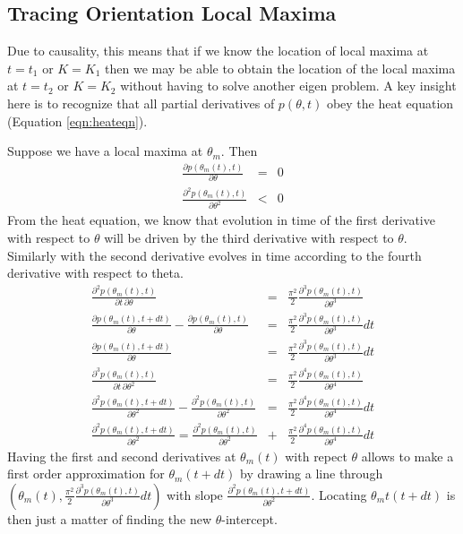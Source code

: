 \documentclass{article}
\begin{document}
\subsection{Tracing Orientation Local Maxima}
Due to causality, this means that if we know the location of local maxima at $ t = t_1 $ or $ K = K_1 $ then we may be able to obtain the location of the local maxima at $ t = t_2 $ or $ K = K_2 $ without having to solve another eigen problem. A key insight here is to recognize that all partial derivatives of $ p(\theta,t) $ obey the heat equation (Equation \ref{eqn:heateqn}).

Suppose we have a local maxima at $ \theta_m $. Then
\begin{eqnarray}
	\frac{\partial p(\theta_m(t),t)}{\partial \theta} & = & 0 \\
	\frac{\partial^2 p(\theta_m(t),t)}{\partial \theta^2} & < & 0 
\end{eqnarray}
From the heat equation, we know that evolution in time of the first derivative with respect to $ \theta $ will be driven by the third derivative with respect to $ \theta $. Similarly with the second derivative evolves in time according to the fourth derivative with respect to theta.
\begin{eqnarray}
	\frac{\partial^2 p(\theta_m(t),t)}{\partial t \, \partial \theta} & = & \frac{\pi^2}{2} \frac{\partial^3 p(\theta_m(t),t)}{\partial \theta^3} \\
	\frac{\partial p(\theta_m(t),t+dt)}{\partial \theta} - \frac{\partial p(\theta_m(t),t)}{\partial \theta} & = & \frac{\pi^2}{2} \frac{\partial^3 p(\theta_m(t),t)}{\partial \theta^3} dt \\
	\frac{\partial p(\theta_m(t),t+dt)}{\partial \theta} & = & \frac{\pi^2}{2} \frac{\partial^3 p(\theta_m(t),t)}{\partial \theta^3} dt \\
	\frac{\partial^3 p(\theta_m(t),t)}{\partial t \, \partial \theta^2} & = & \frac{\pi^2}{2} \frac{\partial^4 p(\theta_m(t),t)}{\partial \theta^4}  \\
	\frac{\partial^2 p(\theta_m(t),t+dt)}{\partial \theta^2} - \frac{\partial^2 p(\theta_m(t),t)}{\partial \theta^2} & = & \frac{\pi^2}{2} \frac{\partial^4 p(\theta_m(t),t)}{\partial \theta^4} dt \\
	\frac{\partial^2 p(\theta_m(t),t+dt)}{\partial \theta^2} =  \frac{\partial^2 p(\theta_m(t),t)}{\partial \theta^2} & + & \frac{\pi^2}{2} \frac{\partial^4 p(\theta_m(t),t)}{\partial \theta^4} dt
\end{eqnarray}
Having the first and second derivatives at $ \theta_m(t) $ with repect $ \theta $ allows to make a first order approximation for $ \theta_m(t+dt) $ by drawing a line through $ ( \theta_m(t) , \frac{\pi^2}{2} \frac{\partial^3 p(\theta_m(t),t)}{\partial \theta^3} dt ) $ with slope $ \frac{\partial^2 p(\theta_m(t),t+dt)}{\partial \theta^2} $. Locating $ \theta_mt(t+dt) $ is then just a matter of finding the new $\theta$-intercept.
\end{document}
